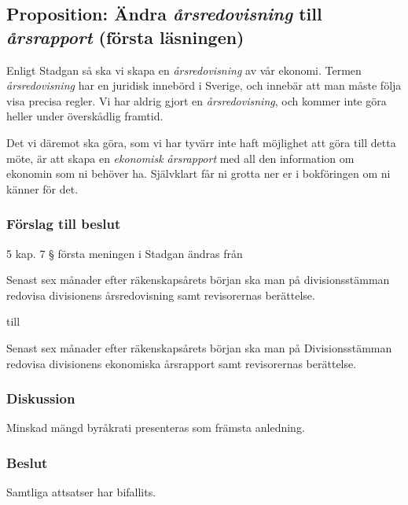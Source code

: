 \documentclass[protokoll]{dvd}
\begin{document}
\newpage
\subsection{Proposition: Ändra \emph{årsredovisning} till \emph{årsrapport} (första läsningen)}

Enligt Stadgan så ska vi skapa en \emph{årsredovisning} av vår ekonomi.
Termen \emph{årsredovisning} har en juridisk innebörd i Sverige, och innebär att man måste följa visa precisa regler.
Vi har aldrig gjort en \emph{årsredovisning}, och kommer inte göra heller under överskådlig framtid.

Det vi däremot ska göra, som vi har tyvärr inte haft möjlighet att göra till detta möte, är att skapa en \emph{ekonomisk årsrapport} med all den information om ekonomin som ni behöver ha.
Självklart får ni grotta ner er i bokföringen om ni känner för det.

\subsubsection*{Förslag till beslut}

\begin{attsatser}
	\item 5 kap. 7 § första meningen i Stadgan ändras från

	\begin{displayquote}
        Senast sex månader efter räkenskapsårets början ska man på divisionsstämman redovisa divisionens årsredovisning samt revisorernas berättelse.
    \end{displayquote}

    till

    \begin{displayquote}
        Senast sex månader efter räkenskapsårets början ska man på Divisionsstämman redovisa divisionens ekonomiska årsrapport samt revisorernas berättelse.
    \end{displayquote}
\end{attsatser}

\subsubsection{Diskussion}
Minskad mängd byråkrati presenteras som främsta anledning. 

\subsubsection{Beslut}
\begin{attsatser}
	\item Samtliga attsatser har bifallits.
\end{attsatser}
\end{document}
